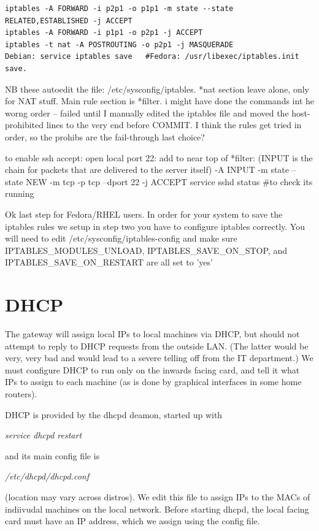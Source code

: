 \documentclass[oneside,english]{scrbook}
\begin{document}
\begin{lstlisting}
iptables -A FORWARD -i p2p1 -o p1p1 -m state --state RELATED,ESTABLISHED -j ACCEPT
iptables -A FORWARD -i p1p1 -o p2p1 -j ACCEPT
iptables -t nat -A POSTROUTING -o p2p1 -j MASQUERADE
Debian: service iptables save   #Fedora: /usr/libexec/iptables.init save.
\end{lstlisting}

NB these autoedit the file:  /etc/sysconfig/iptables.   *nat section leave alone, only for NAT stuff.   Main rule section is *filter.
    i might have done the commands int he worng order -- failed until I manually edited the iptables file and moved the host-prohibited lines to the very end before COMMIT.  I think the rules get tried in order, so the prohibs are the fail-through last choice?

to enable ssh accept: open local port 22: add to near top of *filter:   (INPUT is the chain for packets that are delivered to the server itself)
  -A INPUT -m state --state NEW -m tcp -p tcp --dport 22 -j ACCEPT
    service sshd status  #to check its running

Ok last step for Fedora/RHEL users. In order for your system to save the iptables rules we setup in step two you have to configure iptables correctly. You will need to edit /etc/sysconfig/iptables-config and make sure IPTABLES_MODULES_UNLOAD, IPTABLES_SAVE_ON_STOP, and IPTABLES_SAVE_ON_RESTART are all set to 'yes'


\section{DHCP}

The gateway will assign local IPs to local machines via DHCP, but
should not attempt to reply to DHCP requests from the outside LAN.
(The latter would be very, very bad and would lead to a severe telling
off from the IT department.) We must configure DHCP to run only on
the inwards facing card, and tell it what IPs to assign to each machine
(as is done by graphical interfaces in some home routers).

DHCP is provided by the dhcpd deamon, started up with

\emph{service dhcpd restart}

and its main config file is

\emph{/etc/dhcpd/dhcpd.conf}

(location may vary across distros). We edit this file to assign IPs
to the MACs of indiivudal machines on the local network. Before starting
dhcpd, the local facing card must have an IP address, which we assign
using the config file.
\end{document}
